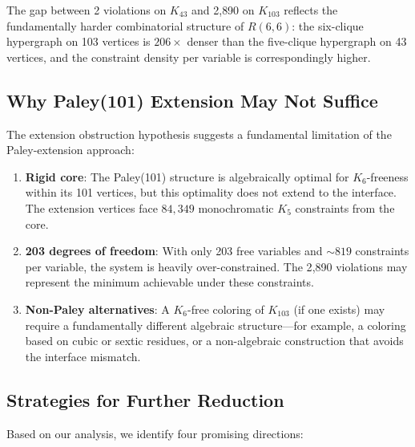 \documentclass[11pt,a4paper]{article}
\theoremstyle{plain}
\theoremstyle{remark}
\begin{document}
The gap between 2 violations on $K_{43}$ and 2{,}890 on $K_{103}$
reflects the fundamentally harder combinatorial structure of
$R(6,6)$: the six-clique hypergraph on 103 vertices is
$206\times$ denser than the five-clique hypergraph on 43 vertices,
and the constraint density per variable is correspondingly higher.

\subsection{Why Paley(101) Extension May Not Suffice}

The extension obstruction hypothesis suggests a fundamental
limitation of the Paley-extension approach:

\begin{enumerate}[leftmargin=2em]
  \item \textbf{Rigid core}: The Paley(101) structure is
    algebraically optimal for $K_6$-freeness within its 101 vertices,
    but this optimality does not extend to the interface.
    The extension vertices face $84{,}349$ monochromatic $K_5$
    constraints from the core.

  \item \textbf{203 degrees of freedom}: With only 203 free
    variables and ${\sim}819$ constraints per variable, the system
    is heavily over-constrained. The 2{,}890 violations may
    represent the minimum achievable under these constraints.

  \item \textbf{Non-Paley alternatives}: A $K_6$-free coloring
    of $K_{103}$ (if one exists) may require a fundamentally
    different algebraic structure---for example, a coloring
    based on cubic or sextic residues, or a non-algebraic
    construction that avoids the interface mismatch.
\end{enumerate}

\subsection{Strategies for Further Reduction}

Based on our analysis, we identify four promising directions:
\end{document}
